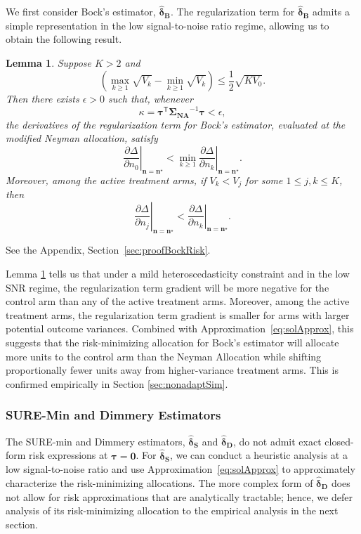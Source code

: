 \documentclass{article}
\newcommand{\bsSigmaN}{\boldsymbol {\Sigma_{\textbf{NA}}}}
\newcommand{\bstau}{\boldsymbol \tau}
\newcommand{\bsn}{\boldsymbol n}
\newcommand{\bsdeltad}{\boldsymbol{\hat \delta_{\textbf{D}}}}
\newtheorem{lemma}{Lemma}
\newenvironment{proof*}
  {\renewcommand{\qedsymbol}{}\proof}
  {\endproof}
\newcommand{\bsdeltb}{\boldsymbol {\hat \delta_B}}
\newcommand{\bsdelts}{\boldsymbol {\hat \delta_S}}
\newcommand{\tran}{\mathsf{T}}
\begin{document}
We first consider Bock's estimator, $\bsdeltb$. The regularization term for $\bsdeltb$ admits a simple representation in the low signal-to-noise ratio regime, allowing us to obtain the following result. 

\begin{lemma}\label{lemma:bockRiskZero}
Suppose $K>2$ and
\begin{equation}\label{eq:riskConditionBock}
\left( \max_{k\geq 1}\sqrt{V_k}-\min_{k\geq 1}\sqrt{V_k} \right) \leq\frac{1}{2}\sqrt{KV_0}. 
\end{equation}
Then there exists $\epsilon>0$ such that, whenever
\[ \kappa =\bstau^\tran\bsSigmaN^{-1}\bstau<\epsilon, \]
the derivatives of the regularization term for Bock's estimator, evaluated at the modified Neyman allocation, satisfy
\[ \left.\frac{\partial\Delta}{\partial n_0}\right|_{\bsn=\bsn^\star}<\min_{k\geq1}\left.\frac{\partial\Delta}{\partial n_k}\right|_{\bsn=\bsn^\star}. \]
Moreover, among the active treatment arms, if $V_k < V_j$ for some $1 \leq j, k \leq K$, then 
\[ \left.\frac{\partial\Delta}{\partial n_j}\right|_{\bsn=\bsn^\star}<\left.\frac{\partial\Delta}{\partial n_k}\right|_{\bsn=\bsn^\star}. \]
\end{lemma}

\begin{proof*}
See the Appendix, Section~\ref{sec:proofBockRisk}.
\end{proof*}

Lemma \ref{lemma:bockRiskZero} tells us that under a mild heteroscedasticity constraint and in the low SNR regime, the regularization term gradient will be more negative for the control arm than any of the active treatment arms. Moreover, among the active treatment arms, the regularization term gradient is smaller for arms with larger potential outcome variances. Combined with Approximation~\eqref{eq:solApprox}, this suggests that the risk-minimizing allocation for Bock's estimator will allocate more units to the control arm than the Neyman Allocation while shifting proportionally fewer units away from higher-variance treatment arms. This is confirmed empirically in Section \ref{sec:nonadaptSim}.

\subsubsection{SURE-Min and Dimmery Estimators}

The SURE-min and Dimmery estimators, $\bsdelts$ and $\bsdeltad$, do not admit exact closed-form risk expressions at $\bstau=\boldsymbol 0$. For $\bsdelts$, we can conduct a heuristic analysis at a low signal-to-noise ratio and use Approximation~\eqref{eq:solApprox} to approximately characterize the risk-minimizing allocations. The more complex form of $\bsdeltad$ does not allow for risk approximations that are analytically tractable; hence, we defer analysis of its risk-minimizing allocation to the empirical analysis in the next section. 
\end{document}
